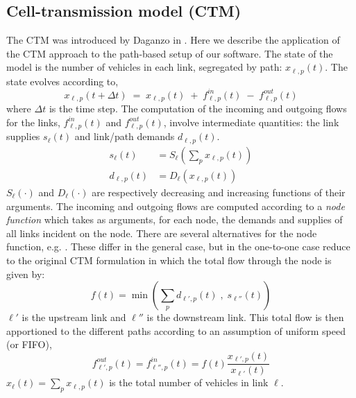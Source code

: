 
\subsection{Cell-transmission model (CTM)}
The CTM was introduced by Daganzo in \cite{daganzo1995cell}. 
Here we describe the application of the CTM approach to the path-based setup of our software. The state of the model is the number of vehicles in each link, segregated by path: $x_{\ell,p}(t)$. The state evolves according to,
\begin{equation}
x_{\ell,p}(t+\Delta t) \;=\; x_{\ell,p}(t) \;+\; f^{in}_{\ell,p}(t) \;-\; f^{out}_{\ell,p}(t)
\end{equation}
where $\Delta t$ is the time step. The computation of the incoming and outgoing flows for the links, $f^{in}_{\ell,p}(t)$ and $f^{out}_{\ell,p}(t)$, involve intermediate quantities: the link supplies $s_\ell(t)$ and link/path demands $d_{\ell,p}(t)$.
\begin{align}
s_\ell(t) &= S_\ell\left(\sum_{p} x_{\ell,p}(t)\right) \\
d_{\ell,p}(t) &= D_\ell(x_{\ell,p}(t))
\end{align}
$S_\ell(\cdot)$ and $D_\ell(\cdot)$ are respectively decreasing and increasing functions of their arguments. The incoming and outgoing flows are computed according to a \textit{node function} which takes as arguments, for each node, the demands and supplies of all links incident on the node. There are several alternatives for the node function, e.g.  \cite{wright2017node,tampere2011generic}. These differ in the general case, but in the one-to-one case reduce to the original CTM formulation in which the total flow through the node is given by:
\begin{equation}
\label{eq:f}
f(t) = \min\left( \sum_{p}d_{\ell',p}(t) \; , \; s_{\ell''}(t)  \right)
\end{equation}
$\ell'$ is the upstream link and $\ell''$ is the downstream link. This total flow is then apportioned to the different paths according to an assumption of uniform speed (or FIFO),
\begin{equation}
f^{out}_{\ell',p}(t) = f^{in}_{\ell'',p}(t) = f(t)\frac{x_{\ell',p}(t)}{x_{\ell'}(t)}
\end{equation}
$x_{\ell}(t) = \sum_{p} x_{\ell,p}(t)$ is the total number of vehicles in link $\ell$.

